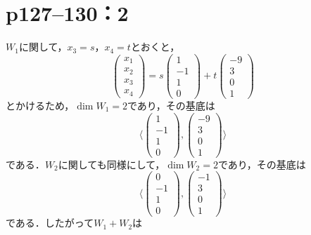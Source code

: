 \section*{p127--130：2}

\begin{tanswer}
  $ W_1$に関して，$x_3 =s$，$x_4 =t$とおくと，
  \[
    \begin{pmatrix} x_1 \\ x_2 \\ x_3 \\ x_4 \end{pmatrix} = s \begin{pmatrix} 1 \\ -1 \\ 1 \\ 0 \end{pmatrix} + t \begin{pmatrix} -9 \\ 3 \\ 0 \\ 1 \end{pmatrix}
  \]
  とかけるため，$\dim W_1 = 2$であり，その基底は
  \[
    \langle  \begin{pmatrix} 1 \\ -1 \\ 1 \\ 0 \end{pmatrix} , \begin{pmatrix} -9 \\ 3 \\ 0 \\ 1 \end{pmatrix} \rangle
  \]
  である．$W_2$に関しても同様にして，$\dim W_2 = 2$であり，その基底は
  \[
    \langle \begin{pmatrix} 0 \\ -1 \\ 1 \\ 0 \end{pmatrix} , \begin{pmatrix} -1 \\ 3 \\ 0 \\ 1 \end{pmatrix} \rangle
  \]
  である．したがって$W_1 + W_2$は
  \[
\]
\end{tanswer}
